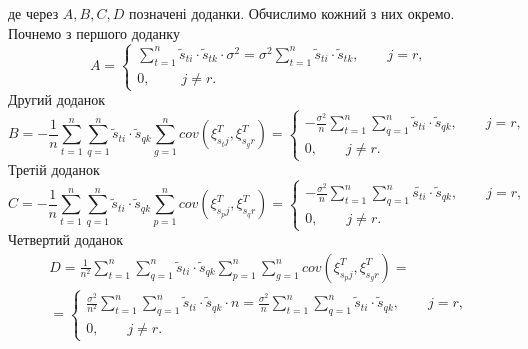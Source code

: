 де через $A, B, C, D$ позначені доданки.
Обчислимо кожний з них окремо.
Почнемо з першого доданку
\begin{equation*}
  A =
  \begin{cases}
    \sum \limits_{t=1}^n \tilde{s}_{ti} \cdot \tilde{s}_{tk} \cdot \sigma^2 =
    \sigma^2 \sum \limits_{t=1}^n \tilde{s}_{ti} \cdot \tilde{s}_{tk},
    \qquad j = r, \\
    0,\ \qquad j \neq r.
  \end{cases}
\end{equation*}
Другий доданок
\begin{equation*}
  B =
  -\frac{1}{n} \sum \limits_{t=1}^n
    \sum \limits_{q=1}^n
      \tilde{s}_{ti} \cdot \tilde{s}_{qk} \sum \limits_{g=1}^n
        cov \left( \xi_{s_t j}^T, \xi_{s_g r}^T \right) =
  \begin{cases}
    -\frac{\sigma^2}{n} \sum \limits_{t=1}^n
      \sum \limits_{q=1}^n \tilde{s}_{ti} \cdot \tilde{s}_{qk}, \qquad j = r, \\
    0, \qquad j \neq r.
  \end{cases}
\end{equation*}
Третій доданок
\begin{equation*}
  C =
  -\frac{1}{n} \sum \limits_{t=1}^n
    \sum \limits_{q=1}^n
      \tilde{s}_{ti} \cdot \tilde{s}_{qk} \sum \limits_{p=1}^n
        cov \left( \xi_{s_p j}^T, \xi_{s_q r}^T \right) =
  \begin{cases}
    -\frac{\sigma^2}{n} \sum \limits_{t=1}^n \sum \limits_{q=1}^n
      \tilde{s_{ti}} \cdot \tilde{s}_{qk}, \qquad j = r, \\
    0, \qquad j \neq r.
  \end{cases}
\end{equation*}
Четвертий доданок
\begin{equation*}
  \begin{gathered}
    D =
    \frac{1}{n^2} \sum \limits_{t=1}^n
      \sum \limits_{q=1}^n
        \tilde{s}_{ti} \cdot \tilde{s}_{qk} \sum \limits_{p=1}^n
          \sum \limits_{g=1}^n cov \left( \xi_{s_p j}^T, \xi_{s_g r}^T \right) = \\
    = \begin{cases}
      \frac{\sigma^2}{n^2} \sum \limits_{t=1}^n
        \sum \limits_{q=1}^n \tilde{s}_{ti} \cdot \tilde{s}_{qk} \cdot n =
      \frac{\sigma^2}{n} \sum \limits_{t=1}^n
        \sum \limits_{q=1}^n \tilde{s}_{ti} \cdot \tilde{s}_{qk}, \qquad j = r, \\
      0, \qquad j \neq r.
    \end{cases}
  \end{gathered}
\end{equation*}
